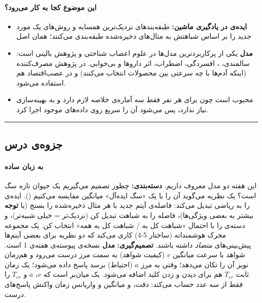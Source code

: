\paragraph{این موضوع کجا به کار می‌رود؟}

\begin{itemize}
\tightlist
\item
  \textbf{ایده‌ی  در یادگیری ماشین:} طبقه‌بندهای نزدیک‌ترین
  همسایه  و روش‌های  یک مورد جدید را بر
  اساس شباهتش به مثال‌های ذخیره‌شده طبقه‌بندی می‌کنند؛ همان اصل 
\item
  \textbf{مدل } یکی از پرکاربردترین مدل‌ها در علوم
  اعصاب شناختی و پژوهش بالینی است: سالمندی، ، افسردگی، اضطراب،
  اثر داروها و بی‌خوابی. در پژوهش مصرف‌کننده (اینکه آدم‌ها با چه سرعتی بین
  محصولات انتخاب می‌کنند) و در عصب‌اقتصاد هم استفاده می‌شود.
\item
  \textbf{} محبوب است چون برای هر نفر فقط سه آماره‌ی
  خلاصه لازم دارد و به بهینه‌سازی نیاز ندارد، پس می‌شود آن را سریع روی
  داده‌های موجود اجرا کرد.
\end{itemize}

\begin{center}\rule{0.5\linewidth}{0.5pt}\end{center}


\subsection{جزوه‌ی درس}

\paragraph{به زبان ساده}

این هفته دو مدل معروف داریم. \textbf{دسته‌بندی:} چطور تصمیم می‌گیریم یک
حیوان تازه سگ است؟ یک نظریه می‌گوید آن را با یک «سگ ایده‌آل» میانگین
مقایسه می‌کنیم (\textbf{}). \textbf{} ایده‌ی
 را به ریاضی تبدیل می‌کند: فاصله‌ی آیتم جدید با هر مثال
ذخیره‌شده را بسنج (با \textbf{توجه} بیشتر به بعضی ویژگی‌ها)، فاصله را به
شباهت تبدیل کن (نزدیک‌تر = خیلی شبیه‌تر)، و دسته‌ی  را با احتمال
«شباهت کل به  / شباهت کل به همه» انتخاب کن. یک مجموعه محرک
هوشمندانه (ساختار 5-4) کاری می‌کند که دو نظریه برای بعضی آیتم‌ها
پیش‌بینی‌های \emph{متضاد} داشته باشند. \textbf{تصمیم‌گیری:} \textbf{مدل
} نسخه‌ی پیوسته‌ی  هفته‌ی 1 است. شواهد
با سرعت میانگین \(v\) (کیفیت شواهد) به سمت مرز درست می‌رود و هم‌زمان نویز
آن را تکان می‌دهد؛ وقتی به مرز \(a\) (احتیاط) برسد پاسخ داده می‌شود؛ یک
زمان ثابت \(T_{er}\) هم برای دیدن و زدن کلید اضافه می‌شود.
\textbf{} یک میان‌بر است که \(v\)، \(a\) و \(T_{er}\) را
فقط از سه عدد حساب می‌کند: دقت، و میانگین و واریانس زمان واکنش پاسخ‌های
درست.

